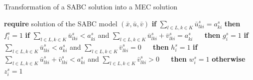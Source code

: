  
\begin{algorithm}
\caption{Transformation of a SABC solution into a MEC solution }\label{alg:cap}
\begin{algorithmic}[1]
\State \textbf{require} solution of the SABC model $(\bar{x},\bar{u},\bar{v})$
    \State \textbf{if } $\sum_{l\in L,k\in K} \bar{u}^s_{lki}= a^s_{ki}$ \textbf{then}  $f^s_i=1$ 
    \State \textbf{if} $\sum_{l\in L,k\in K} \bar{u}^s_{lki}  < a^s_{ki}$ and $ \sum_{l\in L,k\in K} \bar{u}^s_{lki} +\bar{v}^s_{lki} = a^s_{ki}$ 
    \State $\quad $ \textbf{then} $g^s_i=1$ 
    \State \textbf{if } $ \sum_{l\in L,k\in K} \bar{u}^s_{lki}  < a^s_{ki}$ and $\sum_{l\in L,k\in K}\bar{v}^s_{lki}=0$ 
    \State $\quad $ \textbf{then} $h^s_i=1$ 
    \State \textbf{if} $ \sum_{l\in L,k\in K} \bar{u}^s_{lki} +\bar{v}^s_{lki} < a^s_{ki}$ and $\sum_{l\in L,k\in K}\bar{v}^s_{lki}>0$ 
    \State $\quad $ \textbf{then} $w^s_i=1$ 
    \State \textbf{otherwise} $z^s_i=1$ 
\EndFor
{}
\end{algorithmic}
\end{algorithm}


